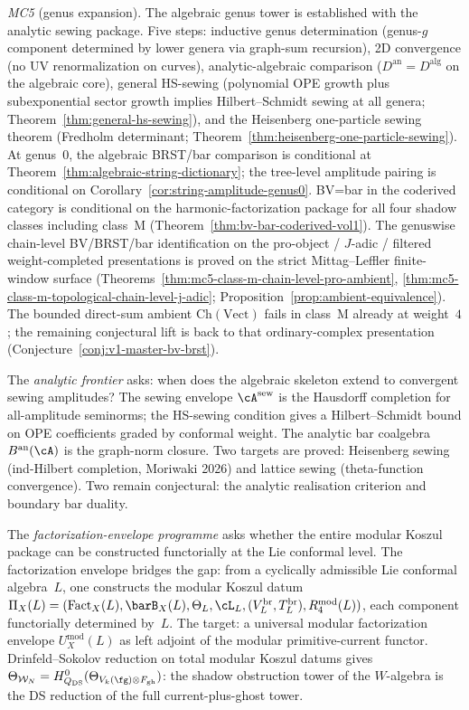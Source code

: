 \noindent\emph{MC5} (genus expansion).
The algebraic genus tower is established with the analytic sewing
package. Five steps: inductive genus determination (genus-$g$ component
determined by lower genera via graph-sum recursion), 2D convergence (no
UV renormalization on curves), analytic-algebraic comparison
($D^{\mathrm{an}}=D^{\mathrm{alg}}$ on the algebraic core), general
HS-sewing (polynomial OPE growth plus subexponential sector growth
implies Hilbert--Schmidt sewing at all genera;
Theorem~\ref{thm:general-hs-sewing}), and the Heisenberg one-particle
sewing theorem (Fredholm determinant;
Theorem~\ref{thm:heisenberg-one-particle-sewing}).
At genus~$0$, the algebraic BRST/bar comparison is conditional
at Theorem~\ref{thm:algebraic-string-dictionary}; the tree-level
amplitude pairing is conditional on
Corollary~\ref{cor:string-amplitude-genus0}.
BV=bar in the coderived category is conditional on the
harmonic-factorization package for all four shadow classes including
class~M (Theorem~\ref{thm:bv-bar-coderived-vol1}).
The genuswise chain-level BV/BRST/bar identification on the
pro-object / $J$-adic / filtered weight-completed presentations is
proved on the strict Mittag--Leffler finite-window surface
\textup{(}Theorems~\ref{thm:mc5-class-m-chain-level-pro-ambient},
\ref{thm:mc5-class-m-topological-chain-level-j-adic};
Proposition~\ref{prop:ambient-equivalence}\textup{)}. The bounded
direct-sum ambient $\mathrm{Ch}(\mathrm{Vect})$ fails in class~M
already at weight~$4$; the remaining conjectural lift is back to that
ordinary-complex presentation
\textup{(}Conjecture~\ref{conj:v1-master-bv-brst}\textup{)}.

\medskip

The \emph{analytic frontier} asks: when does the algebraic skeleton
extend to convergent sewing amplitudes? The sewing envelope
$\cA^{\mathrm{sew}}$ is the Hausdorff completion for all-amplitude
seminorms; the HS-sewing condition gives a Hilbert--Schmidt bound on
OPE coefficients graded by conformal weight. The analytic bar coalgebra
$B^{\mathrm{an}}(\cA)$ is the graph-norm closure. Two targets are
proved: Heisenberg sewing (ind-Hilbert completion, Moriwaki 2026) and
lattice sewing (theta-function convergence). Two remain conjectural:
the analytic realisation criterion and boundary bar duality.

The \emph{factorization-envelope programme} asks whether the entire
modular Koszul package can be constructed functorially at the Lie
conformal level. The factorization envelope bridges the gap: from a
cyclically admissible Lie conformal algebra~$L$, one constructs the
modular Koszul datum
$\Pi_X(L)=(\mathrm{Fact}_X(L),\barB_X(L),\Theta_L,\cL_L,
(V^{\mathrm{br}}_L,T^{\mathrm{br}}_L),R_4^{\mathrm{mod}}(L))$, each
component functorially determined by~$L$. The target: a universal
modular factorization envelope $U^{\mathrm{mod}}_X(L)$ as left adjoint
of the modular primitive-current functor. Drinfeld--Sokolov reduction on
total modular Koszul datums gives
$\Theta_{\mathcal W_N}
=H^0_{Q_{\mathrm{DS}}}(\Theta_{V_k(\fg)\otimes F_{\mathrm{gh}}})$:
the shadow obstruction tower of the $W$-algebra is the DS reduction of
the full current-plus-ghost tower.

